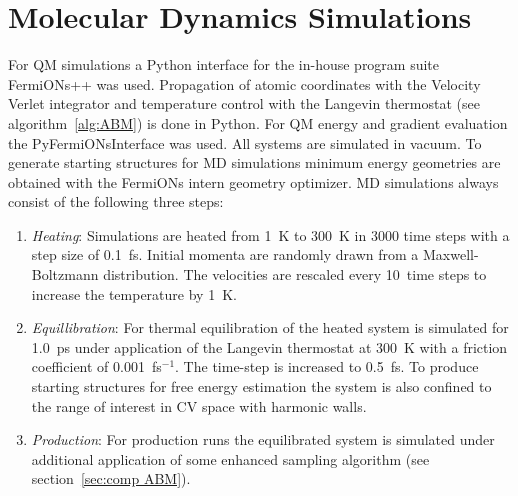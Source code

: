 \section{Molecular Dynamics Simulations}
\label{sec:comp MD}
For QM simulations a Python interface for the in-house program suite FermiONs++\autocite{} was used.
Propagation of atomic coordinates with the Velocity Verlet\autocite{swope1982computer} integrator and temperature control with the Langevin thermostat\autocite{kroger2005models} (see algorithm~\ref{alg:ABM}) is done in Python.
For QM energy and gradient evaluation the PyFermiONsInterface was used.
All systems are simulated in vacuum.
To generate starting structures for MD simulations minimum energy geometries are obtained with the FermiONs intern geometry optimizer. MD simulations always consist of the following three steps:
\begin{enumerate}
  \item \textit{Heating}: Simulations are heated from 1~K to 300~K in 3000 time steps with a step size of 0.1~fs. Initial momenta are randomly drawn from a Maxwell-Boltzmann distribution. The velocities are rescaled every 10~time steps to increase the temperature by 1~K.
  \item \textit{Equillibration}: For thermal equilibration of the heated system is simulated for 1.0~ps under application of the Langevin thermostat at 300~K with a friction coefficient of 0.001~fs$^{-1}$. The time-step is increased to 0.5~fs. To produce starting structures for free energy estimation the system is also confined to the range of interest in CV space with harmonic walls.
  \item \textit{Production}: For production runs the equilibrated system is simulated under additional application of some enhanced sampling algorithm (see section~\ref{sec:comp ABM}).
\end{enumerate}

